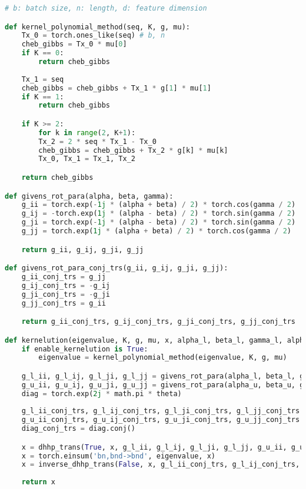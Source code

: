 \begin{algorithm}[!h]
\caption{PyTorch-like pseudocode for Synvolution and Kernelution.}
\label{alg:kernelution}
\begin{lstlisting}[language=python]
# b: batch size, n: length, d: feature dimension

def kernel_polynomial_method(seq, K, g, mu):
    Tx_0 = torch.ones_like(seq) # b, n
    cheb_gibbs = Tx_0 * mu[0]
    if K == 0:
        return cheb_gibbs
    
    Tx_1 = seq
    cheb_gibbs = cheb_gibbs + Tx_1 * g[1] * mu[1]
    if K == 1:
        return cheb_gibbs

    if K >= 2:
        for k in range(2, K+1):
        Tx_2 = 2 * seq * Tx_1 - Tx_0
        cheb_gibbs = cheb_gibbs + Tx_2 * g[k] * mu[k]
        Tx_0, Tx_1 = Tx_1, Tx_2

    return cheb_gibbs

def givens_rot_para(alpha, beta, gamma):
    g_ii = torch.exp(-1j * (alpha + beta) / 2) * torch.cos(gamma / 2)
    g_ij = -torch.exp(1j * (alpha - beta) / 2) * torch.sin(gamma / 2)
    g_ji = torch.exp(-1j * (alpha - beta) / 2) * torch.sin(gamma / 2)
    g_jj = torch.exp(1j * (alpha + beta) / 2) * torch.cos(gamma / 2)

    return g_ii, g_ij, g_ji, g_jj

def givens_rot_para_conj_trs(g_ii, g_ij, g_ji, g_jj):
    g_ii_conj_trs = g_jj
    g_ij_conj_trs = -g_ij
    g_ji_conj_trs = -g_ji
    g_jj_conj_trs = g_ii

    return g_ii_conj_trs, g_ij_conj_trs, g_ji_conj_trs, g_jj_conj_trs

def kernelution(eigenvalue, K, g, mu, x, alpha_l, beta_l, gamma_l, alpha_u, beta_u, gamma_u, theta):
    if enable_kernelution is True:
        eigenvalue = kernel_polynomial_method(eigenvalue, K, g, mu)

    g_l_ii, g_l_ij, g_l_ji, g_l_jj = givens_rot_para(alpha_l, beta_l, gamma_l)
    g_u_ii, g_u_ij, g_u_ji, g_u_jj = givens_rot_para(alpha_u, beta_u, gamma_u)
    diag = torch.exp(2j * math.pi * theta)
    
    g_l_ii_conj_trs, g_l_ij_conj_trs, g_l_ji_conj_trs, g_l_jj_conj_trs = givens_rot_para_conj_trs(g_l_ii, g_l_ij, g_l_ji, g_l_jj)
    g_u_ii_conj_trs, g_u_ij_conj_trs, g_u_ji_conj_trs, g_u_jj_conj_trs = givens_rot_para_conj_trs(g_u_ii, g_u_ij, g_u_ji, g_u_jj)
    diag_conj_trs = diag.conj()

    x = dhhp_trans(True, x, g_l_ii, g_l_ij, g_l_ji, g_l_jj, g_u_ii, g_u_ij, g_u_ji, g_u_jj, diag)
    x = torch.einsum('bn,bnd->bnd', eigenvalue, x)
    x = inverse_dhhp_trans(False, x, g_l_ii_conj_trs, g_l_ij_conj_trs, g_l_ji_conj_trs, g_l_jj_conj_trs, g_u_ii_conj_trs, g_u_ij_conj_trs, g_u_ji_conj_trs, g_u_jj_conj_trs, diag_conj_trs)
    
    return x
\end{lstlisting}
\end{algorithm}

